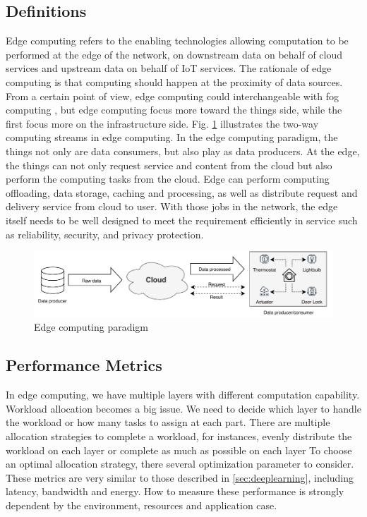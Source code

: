 \subsection{Definitions}
Edge computing refers to the enabling technologies allowing computation to be performed at the edge of the network, on downstream data on behalf of cloud services and upstream data on behalf of IoT services. The rationale of edge computing is that computing should happen at the proximity of data sources. From a certain point of view, edge computing could interchangeable with fog computing \cite{openfog}, but edge computing focus more toward the things side, while the first focus more on the infrastructure side. Fig. \ref{fig:edgearch} illustrates the two-way computing streams in edge computing. In the edge computing paradigm, the things not only are data consumers, but also play as data producers. At the edge, the things can not only request service and content from the cloud but also perform the computing tasks from the cloud. Edge can perform computing offloading, data storage, caching and processing, as well as distribute request and delivery service from cloud to user. With those jobs in the network, the edge itself needs to be well designed to meet the requirement efficiently in service such as reliability, security, and privacy protection.

\begin{figure}
	\includegraphics[width=\linewidth]{images/edgearch}
	\caption{Edge computing paradigm}
	\label{fig:edgearch}
\end{figure}


\subsection{Performance Metrics}
In edge computing, we have multiple layers with different computation capability. Workload allocation becomes a big
issue. We need to decide which layer to handle the workload or how many tasks to assign at each part. There are multiple allocation strategies to complete a workload, for instances,
evenly distribute the workload on each layer or complete as much as possible on each layer To choose an optimal allocation strategy, there several optimization parameter to consider. These metrics are very similar to those described in \ref{sec:deeplearning}, including latency, bandwidth and energy. How to measure these performance is strongly dependent by the environment, resources and application case.


